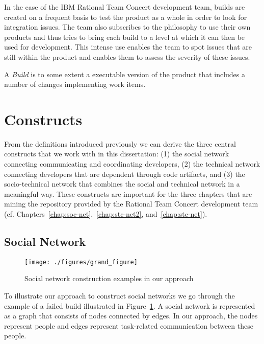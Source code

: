 In the case of the IBM Rational Team Concert development team, builds are created on a frequent basis to test the product as a whole in order to look for integration issues. 
The team also subscribes to the philosophy to use their own products and thus tries to bring each build to a level at which it can then be used for development.
This intense use enables the team to spot issues that are still within the product and enables them to assess the severity of these issues.

\begin{note}
\begin{mydef}
A \emph{Build} is to some extent a executable version of the product that includes a number of changes implementing work items.
\end{mydef}
\end{note}

\section{Constructs}
\label{c5:sec:constructs}
From the definitions introduced previously we can derive the three central constructs that we work with in this dissertation: (1) the social network connecting communicating and coordinating developers, (2) the technical network connecting developers that are dependent through code artifacts, and (3) the socio-technical network that combines the social and technical network in a meaningful way.
These constructs are important for the three chapters that are mining the repository provided by the Rational Team Concert development team (cf. Chapters~\ref{chap:soc-net},~\ref{chap:stc-net2}, and~\ref{chap:stc-net}).

\subsection{Social Network}
\begin{figure}[t!]
\begin{center}
\texttt{[image: ./figures/grand\_figure]}
\caption{Social network construction examples in our approach}
\label{fig:network}
\end{center}
\end{figure}
To illustrate our approach to construct social networks we go through the example of a failed build illustrated in Figure~\ref{fig:network}. 
A social network is represented as a graph that consists of nodes connected by edges. 
In our approach, the nodes represent people and edges represent task-related communication between these people.

